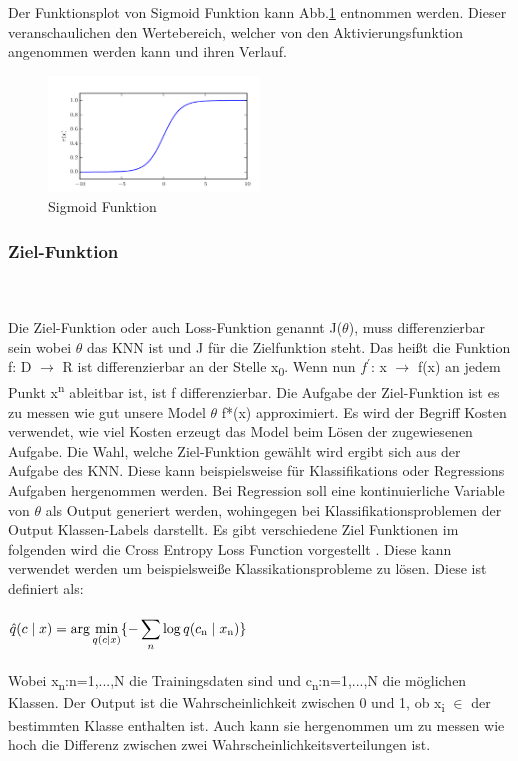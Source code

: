 \documentclass{llncs}
\begin{document}
\vspace{5 mm}
Der Funktionsplot von Sigmoid Funktion kann Abb.\ref{fig:Bild3} entnommen werden. Dieser veranschaulichen den Wertebereich, welcher von den Aktivierungsfunktion angenommen werden kann und ihren Verlauf. 
\begin{figure}[htbp] 
	\centering
	\includegraphics[width=0.5\textwidth]{sigmoid.png}
	\caption{Sigmoid Funktion}
	\label{fig:Bild3}
\end{figure}

\newpage
\subsubsection{Ziel-Funktion}\label{sec:Zielfunktion}
~\\\\
Die Ziel-Funktion oder auch Loss-Funktion genannt J($\theta$), muss differenzierbar sein wobei $\theta$ das KNN ist und J für die Zielfunktion steht. Das heißt die Funktion f: D $\to$ R ist differenzierbar an der Stelle x\textsubscript{0}. Wenn nun $f^\prime$: x $\to$ f(x) an jedem Punkt x\textsuperscript{n} ableitbar ist, ist f differenzierbar. Die Aufgabe der Ziel-Funktion ist es zu messen wie gut unsere Model $\theta$ f*(x) approximiert. Es wird der Begriff Kosten verwendet, wie viel Kosten erzeugt das Model beim Lösen der zugewiesenen Aufgabe. Die Wahl, welche Ziel-Funktion gewählt wird ergibt sich aus der Aufgabe des KNN. Diese kann beispielsweise für Klassifikations oder Regressions Aufgaben hergenommen werden. Bei Regression soll eine kontinuierliche Variable von $\theta$ als Output generiert werden, wohingegen bei Klassifikationsproblemen der Output Klassen-Labels darstellt\cite{Grundlagen}. Es gibt verschiedene Ziel Funktionen im folgenden wird die Cross Entropy Loss Function vorgestellt \cite{crossentropy}. Diese kann verwendet werden um beispielsweiße Klassikationsprobleme zu lösen. Diese ist definiert als:
\\\\
\begin{math}
\hat{q}(c\mid x)=\displaystyle\arg\min_{q(c\mid  x)}\{-\displaystyle\sum_{n}{\log q(c\textsubscript{n}\mid x\textsubscript{n})}\}
\end{math}
\\\\
Wobei  x\textsubscript{n}:n=1,...,N die Trainingsdaten sind und c\textsubscript{n}:n=1,...,N die möglichen Klassen. Der Output ist die Wahrscheinlichkeit zwischen 0 und 1, ob  x\textsubscript{i} $\in$ der bestimmten Klasse enthalten ist. Auch kann sie hergenommen um zu messen wie hoch die Differenz zwischen zwei Wahrscheinlichkeitsverteilungen ist.
\end{document}
